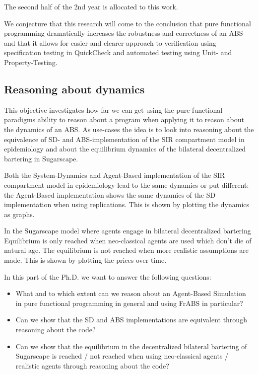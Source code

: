 The second half of the 2nd year is allocated to this work.

We conjecture that this research will come to the conclusion that pure functional programming dramatically increases the robustness and correctness of an ABS and that it allows for easier and clearer approach to verification using specification testing in QuickCheck and automated testing using Unit- and Property-Testing.

\subsection{Reasoning about dynamics}
This objective investigates how far we can get using the pure functional paradigms ability to reason about a program when applying it to reason about the dynamics of an ABS. As use-cases the idea is to look into reasoning about the equivalence of SD- and ABS-implementation of the SIR compartment model in epidemiology and about the equilibrium dynamics of the bilateral decentralized bartering in Sugarscape.

Both the System-Dynamics and Agent-Based implementation of the SIR compartment model in epidemiology lead to the same dynamics or put different: the Agent-Based implementation shows the same dynamics of the SD implementation when using replications. This is shown by plotting the dynamics as graphs. 

In the Sugarscape model where agents engage in bilateral decentralized bartering Equilibrium is only reached when neo-classical agents are used which don't die of natural age. The equilibrium is not reached when more realistic assumptions are made. This is shown by plotting the prices over time. 

In this part of the Ph.D. we want to answer the following questions:
\begin{itemize}
	\item What and to which extent can we reason about an Agent-Based Simulation in pure functional programming in general and using FrABS in particular?
	\item Can we show that the SD and ABS implementations are equivalent through reasoning about the code?
	\item Can we show that the equilibrium in the decentralized bilateral bartering of Sugarscape is reached / not reached when using neo-classical agents / realistic agents through reasoning about the code?
\end{itemize}

